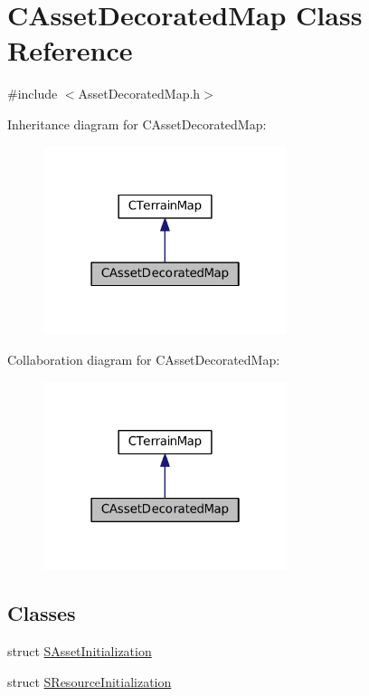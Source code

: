 \hypertarget{classCAssetDecoratedMap}{}\section{C\+Asset\+Decorated\+Map Class Reference}
\label{classCAssetDecoratedMap}


{\ttfamily \#include $<$Asset\+Decorated\+Map.\+h$>$}



Inheritance diagram for C\+Asset\+Decorated\+Map\+:
\nopagebreak
\begin{figure}[H]
\begin{center}
\leavevmode
\includegraphics[width=202pt]{classCAssetDecoratedMap__inherit__graph}
\end{center}
\end{figure}


Collaboration diagram for C\+Asset\+Decorated\+Map\+:
\nopagebreak
\begin{figure}[H]
\begin{center}
\leavevmode
\includegraphics[width=202pt]{classCAssetDecoratedMap__coll__graph}
\end{center}
\end{figure}
\subsection*{Classes}
\begin{DoxyCompactItemize}
\item 
struct \hyperlink{structCAssetDecoratedMap_1_1SAssetInitialization}{S\+Asset\+Initialization}
\item 
struct \hyperlink{structCAssetDecoratedMap_1_1SResourceInitialization}{S\+Resource\+Initialization}
\end{DoxyCompactItemize}
